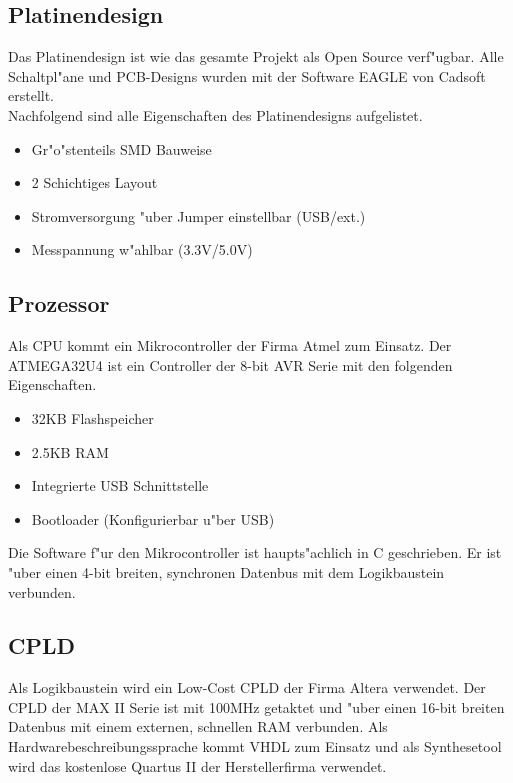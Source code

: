 \documentclass[
a4paper,
]{leaflet}
\begin{document}
\subsection{Platinendesign}

Das Platinendesign ist wie das gesamte Projekt als Open Source verf"ugbar. Alle Schaltpl"ane und PCB-Designs wurden mit der Software EAGLE von Cadsoft erstellt.\\
Nachfolgend sind alle Eigenschaften des Platinendesigns aufgelistet.

\begin{itemize}
  \item Gr"o"stenteils SMD Bauweise
  \item 2 Schichtiges Layout
  \item Stromversorgung "uber Jumper einstellbar (USB/ext.)
  \item Messpannung w"ahlbar (3.3V/5.0V)
\end{itemize}

\subsection{Prozessor}

Als CPU kommt ein Mikrocontroller der Firma Atmel zum Einsatz. Der ATMEGA32U4 ist ein Controller der 8-bit AVR Serie mit den folgenden Eigenschaften.

\begin{itemize}
  \item 32KB Flashspeicher
  \item 2.5KB RAM
  \item Integrierte USB Schnittstelle
  \item Bootloader (Konfigurierbar u"ber USB)
\end{itemize}

Die Software f"ur den Mikrocontroller ist haupts"achlich in C geschrieben. Er ist "uber einen 4-bit breiten, synchronen Datenbus mit dem Logikbaustein verbunden.

\subsection{CPLD}

Als Logikbaustein wird ein Low-Cost CPLD der Firma Altera verwendet. Der CPLD der MAX II Serie ist mit 100MHz getaktet und "uber einen 16-bit breiten Datenbus mit einem externen, schnellen RAM verbunden. Als Hardwarebeschreibungssprache kommt VHDL zum Einsatz und als Synthesetool wird das kostenlose Quartus II der Herstellerfirma verwendet.
\end{document}
